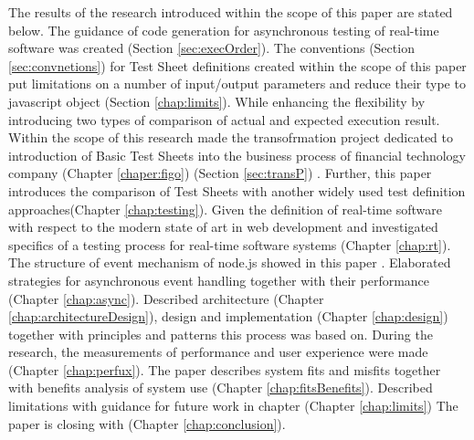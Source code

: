 The results of the research introduced within the scope of this paper are stated below.
The guidance of code generation for asynchronous testing of real-time software was created (Section \ref{sec:execOrder}). 
The conventions (Section \ref{sec:convnetions}) for Test Sheet definitions created within the scope of this paper put limitations on a number of input/output parameters and reduce their type to javascript object (Section \ref{chap:limits}).
While enhancing the flexibility by introducing two types of comparison of actual and expected execution result. 
Within the scope of this research made the transofrmation project dedicated to introduction of Basic Test Sheets into the business process of financial technology company (Chapter \ref{chaper:figo}) (Section \ref{sec:transP}) .
Further, this paper introduces the comparison of Test Sheets with another widely used test definition approaches(Chapter \ref{chap:testing}). 
Given the definition of real-time software with respect to the modern state of art in web development and investigated specifics of a testing process for real-time software systems (Chapter \ref{chap:rt}).
The structure of event mechanism of node.js showed in this paper . Elaborated strategies for asynchronous event handling together with their performance (Chapter \ref{chap:async}). 
Described architecture (Chapter \ref{chap:architectureDesign}), design and implementation (Chapter \ref{chap:design}) together with principles and patterns this process was based on. 
During the research, the measurements of performance and user experience were made (Chapter  \ref{chap:perfux}). 
The paper describes system fits and misfits together with benefits analysis of system use (Chapter \ref{chap:fitsBenefits}).
Described limitations with guidance for future work in chapter (Chapter \ref{chap:limits}) The paper is closing with (Chapter \ref{chap:conclusion}).



